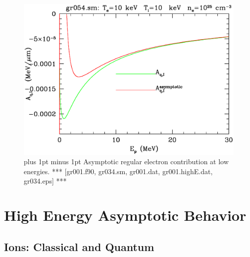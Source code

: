 \documentclass[preprint,12pt,eqsecnum,nofootinbib,amsmath,amssymb]{revtex4}
\newcommand{\footnoteskip}{\baselineskip 12pt plus 1pt minus 1pt}
\begin{document}
\vskip-2cm 
\begin{figure}[h!]
\includegraphics[scale=0.45]{gr054.eps} 
\vskip-0.8cm 
\caption{\footnoteskip  
  Asymptotic regular electron contribution at low energies. 
  *** [gr001.f90, gr034.sm, gr001.dat, gr001.highE.dat, gr034.eps] ***
}
\end{figure}



\pagebreak
\section{High Energy Asymptotic Behavior}

\subsection{Ions: Classical and Quantum}
\end{document}
